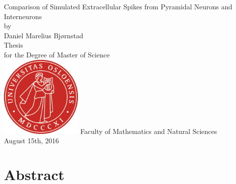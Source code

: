 \documentclass[altfont, fleqn]{uiophd}
\begin{document}
\begin{titlepage}
    \centering
    \vfill
    {
        {
            \LARGE
            Comparison of Simulated Extracellular Spikes from Pyramidal
            Neurons and Interneurons\\
        }
        \vskip1cm
        by \\ 
        \vskip1cm
        {
            \Large Daniel Marelius Bj\o rnstad\\
        }
        \vskip2cm
        {
            \LARGE Thesis\\ 
        }
        \vskip0.5cm
        for the Degree of
        \vskip0.3cm
        {
            \LARGE Master of Science\\
        }
    }    
    \vfill
    \includegraphics[width=4cm]{images/uio_logo.png} %
    \vfill
    {
        Faculty of Mathematics and Natural Sciences\\
        August 15th, 2016\\
    }    
    \vfill
\end{titlepage}
\chapter*{Abstract}
\noindent
\end{document}
